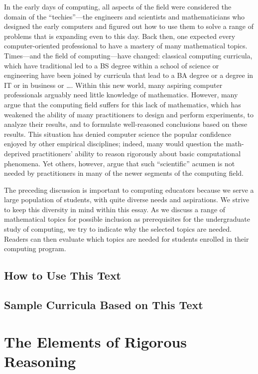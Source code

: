 In the early days of computing, all aspects of the field were
considered the domain of the ``techies''---the engineers and
scientists and mathematicians who designed the early computers and
figured out how to use them to solve a range of problems that is
expanding even to this day.  Back then, one expected every
computer-oriented professional to have a mastery of many mathematical
topics.  Times---and the field of computing---have changed: classical
computing curricula, which have traditional led to a BS degree within
a school of science or engineering have been joined by curricula that
lead to a BA degree or a degree in IT or in business or \ldots.
Within this new world, many aspiring computer professionals arguably
need little knowledge of mathematics.  However, many argue that the
computing field suffers for this lack of mathematics, which has
weakened the ability of many practitioners to design and perform
experiments, to analyze their results, and to formulate well-reasoned
conclusions based on these results.  This situation has denied
computer science the popular confidence enjoyed by other empirical
disciplines; indeed, many would question the math-deprived
practitioners' ability to reason rigorously about basic computational
phenomena.  Yet others, however, argue that such ``scientific'' acumen
is not needed by practitioners in many of the newer segments of the
computing field.

The preceding discussion is important to computing educators because
we serve a large population of students, with quite diverse needs and
aspirations.  We strive to keep this diversity in mind within this
essay.  As we discuss a range of mathematical topics for possible
inclusion as prerequisites for the undergraduate study of computing,
we try to indicate why the selected topics are needed.  Readers can
then evaluate which topics are needed for students enrolled in their
computing program.

\subsection{How to Use This Text}
\label{sec:how-to-use}


\subsection{Sample Curricula Based on This Text}
\label{sec:sample-curricula}



\section{The Elements of Rigorous Reasoning}
\label{sec:elements-of-reasoning}

